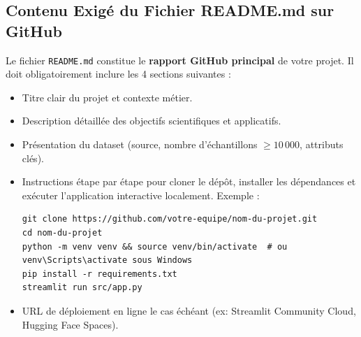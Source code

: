 \documentclass[11pt,a4paper]{article}
\begin{document}
\subsection{Contenu Exigé du Fichier README.md sur GitHub}
Le fichier \texttt{README.md} constitue le \textbf{rapport GitHub principal} de votre projet. Il doit obligatoirement inclure les 4 sections suivantes :

\begin{tcolorbox}[colback=lightgray, colframe=sintefblue, title=\textbf{SECTION 1 : Présentation, Objectifs et Description du Projet}, arc=2mm]
    \begin{itemize}
        \item Titre clair du projet et contexte métier.
        \item Description détaillée des objectifs scientifiques et applicatifs.
        \item Présentation du dataset (source, nombre d'échantillons $\ge 10\,000$, attributs clés).
    \end{itemize}
\end{tcolorbox}

\begin{tcolorbox}[colback=lightgray, colframe=sintefblue, title=\textbf{SECTION 2 : Guide d'Installation et Lancement de l'Application}, arc=2mm]
    \begin{itemize}
        \item Instructions étape par étape pour cloner le dépôt, installer les dépendances et exécuter l'application interactive localement. Exemple :
        \begin{verbatim}
git clone https://github.com/votre-equipe/nom-du-projet.git
cd nom-du-projet
python -m venv venv && source venv/bin/activate  # ou venv\Scripts\activate sous Windows
pip install -r requirements.txt
streamlit run src/app.py
        \end{verbatim}
        \item URL de déploiement en ligne le cas échéant (ex: Streamlit Community Cloud, Hugging Face Spaces).
    \end{itemize}
\end{tcolorbox}
\end{document}
